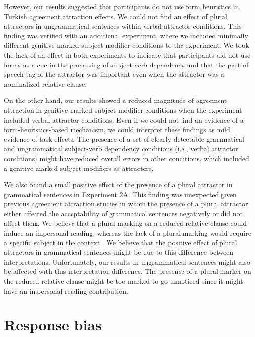 However, our results suggested that participants do not use form heuristics in Turkish agreement attraction effects. We could not find an effect of plural attractors in ungrammatical sentences within verbal attractor conditions. This finding was verified with an additional experiment, where we included minimally different genitive marked subject modifier conditions to the experiment. We took the lack of an effect in both experiments to indicate that participants did not use forms as a cue in the processing of subject-verb dependency and that the part of speech tag of the attractor was important even when the attractor was a nominalized relative clause.

On the other hand, our results showed a reduced magnitude of agreement attraction in genitive marked subject modifier conditions when the experiment included verbal attractor conditions. Even if we could not find an evidence of a form-heuristics-based mechanism, we could interpret these findings as mild evidence of task effects. The presence of a set of clearly detectable grammatical and ungrammatical subject-verb dependency conditions (i.e., verbal attractor conditions) might have reduced overall errors in other conditions, which included a genitive marked subject modifiers as attractors. 

We also found a small positive effect of the presence of a plural attractor in grammatical sentences in Experiment 2A. This finding was unexpected given previous agreement attraction studies in which the presence of a plural attractor either affected the acceptability of grammatical sentences negatively or did not affect them. We believe that a plural marking on a reduced relative clause could induce an impersonal reading, whereas the lack of a plural marking would require a specific subject in the context \citep{Kornfilt:2011}. We believe that the positive effect of plural attractors in grammatical sentences might be due to this difference between interpretations. Unfortunately, our results in ungrammatical sentences might also be affected with this interpretation difference. The presence of a plural marker on the reduced relative clause might be too marked to go unnoticed since it might have an impersonal reading contribution. 

\section{Response bias} \label{ch6bias}

